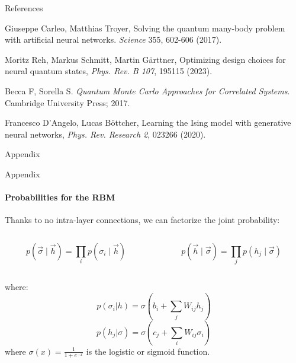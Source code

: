 \documentclass{beamer}
\begin{document}
\begin{frame}{References}
\begin{thebibliography}{99}
Giuseppe Carleo, Matthias Troyer, Solving the quantum many-body problem with artificial neural networks. \textit{Science} 355, 602-606 (2017).

Moritz Reh, Markus Schmitt, Martin Gärttner, Optimizing design choices for neural quantum states, \textit{Phys. Rev. B 107}, 195115 (2023).

Becca F, Sorella S. \textit{Quantum Monte Carlo Approaches for Correlated Systems}. Cambridge University Press; 2017.

Francesco D'Angelo, Lucas Böttcher, Learning the Ising model with generative neural networks, \textit{Phys. Rev. Research 2}, 023266 (2020).
\end{thebibliography}
\end{frame}

\backmatter

\appendix


\begin{chapter}{}{Appendix}
\end{chapter}

\begin{frame}{Appendix}
\framesubtitle{Probabilities for the RBM}

Thanks to no intra-layer connections, we can factorize the joint probability:

\begin{columns}[t]
	\begin{column}{0.48\textwidth}
		$$ p(\vec{\sigma} \mid \vec{h}) = \prod_{i} p(\sigma_i \mid \vec{h}) $$
	\end{column}
	\begin{column}{0.48\textwidth}
		$$ p(\vec{h} \mid \vec{\sigma}) = \prod_{j} p(h_j \mid \vec{\sigma}) $$
	\end{column}
\end{columns}
where:
$$ p(\sigma_i | h) = \sigma\left(b_i + \sum_{j} W_{ij} h_j\right) $$
$$ p(h_j | \sigma) = \sigma\left(c_j + \sum_{i} W_{ij} \sigma_i\right) $$
where $\sigma(x) = \frac{1}{1 + e^{-x}}$ is the logistic or sigmoid function.

\end{frame}

%
%
\end{document}
